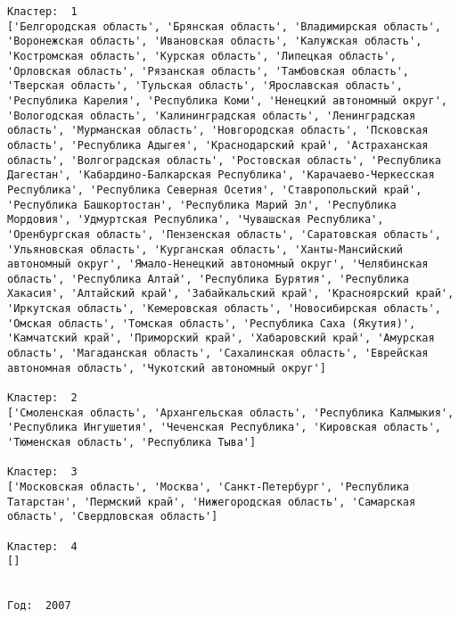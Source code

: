 \documentclass[11pt]{article}
\begin{document}
\begin{Verbatim}[commandchars=\\\{\}]
Кластер:  1
['Белгородская область', 'Брянская область', 'Владимирская область', 'Воронежская область', 'Ивановская область', 'Калужская область', 'Костромская область', 'Курская область', 'Липецкая область', 'Орловская область', 'Рязанская область', 'Тамбовская область', 'Тверская область', 'Тульская область', 'Ярославская область', 'Республика Карелия', 'Республика Коми', 'Ненецкий автономный округ', 'Вологодская область', 'Калинингpадская область', 'Ленинградская область', 'Мурманская область', 'Новгородская область', 'Псковская область', 'Республика Адыгея', 'Краснодарский край', 'Астраханская область', 'Волгоградская область', 'Ростовская область', 'Республика Дагестан', 'Кабардино-Балкарская Республика', 'Карачаево-Черкесская Республика', 'Республика Северная Осетия', 'Ставропольский край', 'Республика Башкортостан', 'Республика Марий Эл', 'Республика Мордовия', 'Удмуртская Республика', 'Чувашская Республика', 'Оренбургская область', 'Пензенская область', 'Саратовская область', 'Ульяновская область', 'Курганская область', 'Ханты-Мансийский автономный округ', 'Ямало-Ненецкий автономный округ', 'Челябинская область', 'Республика Алтай', 'Республика Бурятия', 'Республика Хакасия', 'Алтайский край', 'Забайкальский край', 'Красноярский край', 'Иркутская область', 'Кемеровская область', 'Новосибирская область', 'Омская область', 'Томская область', 'Республика Саха (Якутия)', 'Камчатский край', 'Приморский край', 'Хабаровский край', 'Амурская область', 'Магаданская область', 'Сахалинская область', 'Еврейская автономная область', 'Чукотский автономный округ']

Кластер:  2
['Смоленская область', 'Архангельская область', 'Республика Калмыкия', 'Республика Ингушетия', 'Чеченская Республика', 'Кировская область', 'Тюменская область', 'Республика Тыва']

Кластер:  3
['Московская область', 'Москва', 'Санкт-Петербург', 'Республика Татарстан', 'Пермский край', 'Нижегородская область', 'Самарская область', 'Свердловская область']

Кластер:  4
[]


Год:  2007


\end{Verbatim}
\end{document}
